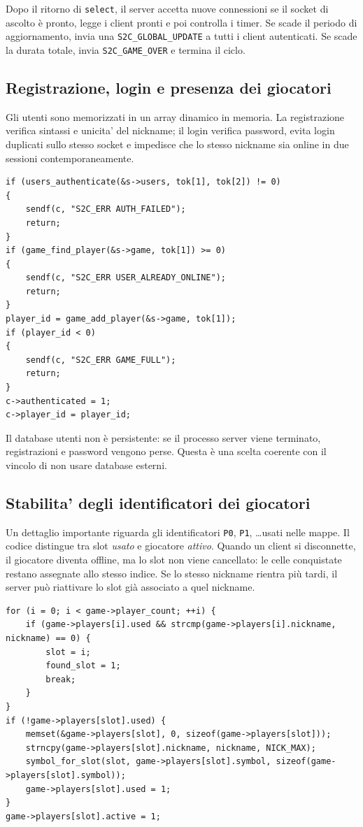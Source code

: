 \documentclass[11pt,a4paper]{article}
\begin{document}
Dopo il ritorno di \texttt{select}, il server accetta nuove connessioni se il
socket di ascolto è pronto, legge i client pronti e poi controlla i timer. Se
scade il periodo di aggiornamento, invia una \texttt{S2C\_GLOBAL\_UPDATE} a
tutti i client autenticati. Se scade la durata totale, invia
\texttt{S2C\_GAME\_OVER} e termina il ciclo.

\subsection{Registrazione, login e presenza dei giocatori}

Gli utenti sono memorizzati in un array dinamico in memoria. La registrazione
verifica sintassi e unicita' del nickname; il login verifica password, evita
login duplicati sullo stesso socket e impedisce che lo stesso nickname sia
online in due sessioni contemporaneamente.

\begin{lstlisting}[style=cstyle, caption={Controlli principali del login lato server.}]
if (users_authenticate(&s->users, tok[1], tok[2]) != 0)
{
    sendf(c, "S2C_ERR AUTH_FAILED");
    return;
}
if (game_find_player(&s->game, tok[1]) >= 0)
{
    sendf(c, "S2C_ERR USER_ALREADY_ONLINE");
    return;
}
player_id = game_add_player(&s->game, tok[1]);
if (player_id < 0)
{
    sendf(c, "S2C_ERR GAME_FULL");
    return;
}
c->authenticated = 1;
c->player_id = player_id;
\end{lstlisting}

Il database utenti non è persistente: se il processo server viene terminato,
registrazioni e password vengono perse. Questa è una scelta coerente con il
vincolo di non usare database esterni.

\subsection{Stabilita' degli identificatori dei giocatori}

Un dettaglio importante riguarda gli identificatori \texttt{P0}, \texttt{P1},
\dots usati nelle mappe. Il codice distingue tra slot \emph{usato} e giocatore
\emph{attivo}. Quando un client si disconnette, il giocatore diventa offline,
ma lo slot non viene cancellato: le celle conquistate restano assegnate allo
stesso indice. Se lo stesso nickname rientra più tardi, il server può riattivare lo slot già associato a quel nickname.

\begin{lstlisting}[style=cstyle, caption={Riattivazione o assegnazione dello slot giocatore.}]
for (i = 0; i < game->player_count; ++i) {
    if (game->players[i].used && strcmp(game->players[i].nickname, nickname) == 0) {
        slot = i;
        found_slot = 1;
        break;
    }
}
if (!game->players[slot].used) {
    memset(&game->players[slot], 0, sizeof(game->players[slot]));
    strncpy(game->players[slot].nickname, nickname, NICK_MAX);
    symbol_for_slot(slot, game->players[slot].symbol, sizeof(game->players[slot].symbol));
    game->players[slot].used = 1;
}
game->players[slot].active = 1;
\end{lstlisting}
\end{document}
